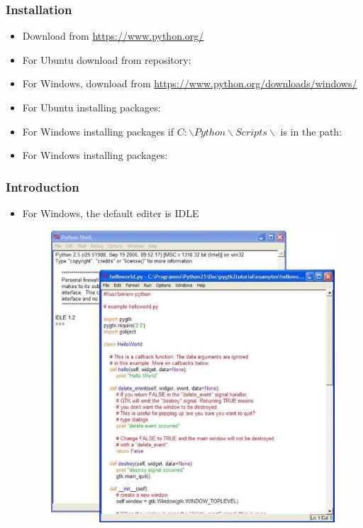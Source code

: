 \begin{frame}
\frametitle{Installation}
\begin{itemize}
\item Download from \url{https://www.python.org/}
\item For Ubuntu download from repository:

\item For Windows, download from \url{https://www.python.org/downloads/windows/}

\item For Ubuntu installing packages:

\item For Windows installing packages if $C:\backslash Python\backslash Scripts \backslash$ is in the path:

\item For Windows installing packages:
\end{itemize}
\end{frame}

\begin{frame}
\frametitle{Introduction}
\begin{itemize}
\item For Windows, the default editer is IDLE
\begin{figure}
\includegraphics[width=0.8\linewidth, height=0.5\linewidth]{idle.png}
\end{figure}
\end{itemize}
\end{frame}


